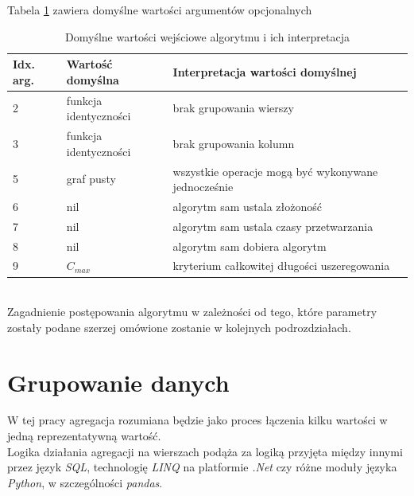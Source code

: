 \documentclass[brudnopis]{xmgr}
\begin{document}

Tabela \ref{tab:args-default} zawiera domyślne wartości argumentów opcjonalnych
\medskip\\


\begin{table}[!tbh]
\begin{tabular}{|l|l|l|} \hline
Idx. arg. & Wartość domyślna & Interpretacja wartości domyślnej \\ \hline
2 & funkcja identyczności   & brak grupowania wierszy \\ \hline
3 & funkcja identyczności   & brak grupowania kolumn \\ \hline
5 & graf pusty              & wszystkie operacje mogą być wykonywane jednocześnie \\ \hline
6 & nil                     & algorytm sam ustala złożoność \\ \hline
7 & nil                     & algorytm sam ustala czasy przetwarzania \\ \hline
8 & nil                     & algorytm sam dobiera algorytm \\ \hline
9 & $C_{max}$               & kryterium całkowitej długości uszeregowania \\ \hline
\end{tabular}
\caption{Domyślne wartości wejściowe algorytmu i ich interpretacja\label{tab:args-default}}
\end{table}
\medskip\\

Zagadnienie postępowania algorytmu w zależności od tego, które parametry zostały podane szerzej omówione zostanie w kolejnych podrozdziałach.

\section{Grupowanie danych}

W tej pracy agregacja rozumiana będzie jako proces łączenia kilku wartości w jedną reprezentatywną wartość.
\medskip\\

Logika działania agregacji na wierszach podąża za logiką przyjęta między innymi przez język \emph{SQL}, technologię \emph{LINQ} na platformie \emph{.Net} czy różne moduły języka \emph{Python}, w szczególności \emph{pandas}.
\medskip\\
\end{document}
